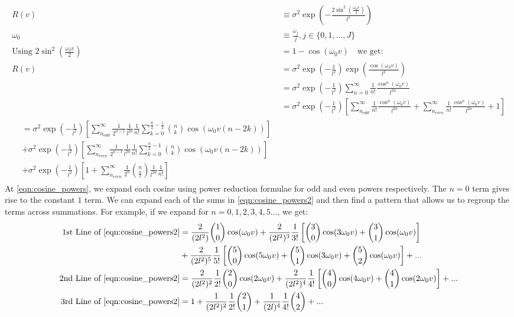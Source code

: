 \begin{align}
R(v) &\equiv \sigma^2 \exp (- \frac{2\sin^2(\frac{\omega_0 v}{2})}{l^2}) \\
\omega_0 &\equiv \frac{\omega_j}{j}, j \in \{0, 1,..., J\} \\
\text{Using } 2\sin^2(\frac{\omega_0 v}{2}) &=  1 - \cos(\omega_0 v) \quad \text{we get:}\\
R(v) &=  \sigma^2 \exp (- \frac{1}{l^2}) \exp (\frac{\cos(\omega_0 v)}{l^2}) \\
 &=  \sigma^2 \exp (- \frac{1}{l^2}) \sum_{n = 0}^{\infty} \frac{1}{n!} \frac{\cos^n(\omega_0 v)}{l^{2n}} \label{eqn:periodic_1}\\
&= \sigma^2 \exp (- \frac{1}{l^2}) \left[\sum_{n_{odd}}^{\infty} \frac{1}{n!} \frac{\cos^n(\omega_0 v)}{l^{2n}} + \sum_{n_{even}}^{\infty} \frac{1}{n!} \frac{\cos^n(\omega_0 v)}{l^{2n}} + 1 \right] \label{eqn:cosine_powers} \\ \begin{split} 
& =\sigma^2 \exp (- \frac{1}{l^2})  \left[ \sum_{n_{odd}}^{\infty} \frac{1}{2^{n-1}} \frac{1}{l^{2n}} \frac{1}{n!}  \sum_{k=0}^{\frac{n}{2} - \frac{1}{2}} \binom{n}{k} \cos(\omega_0v (n -2k))\right] \\
& +\sigma^2 \exp (- \frac{1}{l^2})  \left[ \sum_{n_{even}}^{\infty}  \frac{1}{2^{n-1}} \frac{1}{l^{2n}} \frac{1}{n!}  \sum_{k=0}^{\frac{n}{2} - 1} \binom{n}{k} \cos(\omega_0v (n -2k))\right] \\
& +\sigma^2 \exp (- \frac{1}{l^2})  \left[ 1 +  \sum_{n_{even}}^{\infty}  \frac{1}{2^{n}} \binom{n}{\frac{n}{2}} \frac{1}{l^{2n}} \frac{1}{n!} \right] \label{eqn:cosine_powers2}
\end{split} 
\end{align}
At \ref{eqn:cosine_powers}, we expand each cosine using power reduction formulae for odd and even powers respectively. The $n=0$ term gives rise to the constant $1$ term.  We can expand each of the sums in \ref{eqn:cosine_powers2} and then find a pattern that allows us to regroup the terms across summations. For example, if we expand for $n = 0,1,2,3,4,5...$, we get:
\begin{align}
\text{1st Line of \ref{eqn:cosine_powers2}} &= \frac{2}{(2l^2)}\binom{1}{0} \cos(\omega_0 v) + \frac{2}{(2l^2)^3} \frac{1}{3!} \left[\binom{3}{0} \cos(3 \omega_0 v) + \binom{3}{1} \cos(\omega_0v) \right]  \\
&+ \frac{2}{(2l^2)^5} \frac{1}{5!} \left[\binom{5}{0} \cos(5\omega_0v) + \binom{5}{1} \cos(3\omega_0 v) + \binom{5}{2} \cos(\omega_0 v)\right] + ... \\
\text{2nd Line of \ref{eqn:cosine_powers2}} &= \frac{2}{(2l^2)^2} \frac{1}{2!} \binom{2}{0}\cos(2 \omega_0 v) + \frac{2}{(2l^2)^4} \frac{1}{4!} \left[\binom{4}{0} \cos(4 \omega_0 v) + \binom{4}{1} \cos(2 \omega_0 v) \right] + ... \\
\text{3rd Line of \ref{eqn:cosine_powers2}} &=  1 + \frac{1}{(2l^2)^2} \frac{1}{2!} \binom{2}{1} + \frac{1}{(2l)^4} \frac{1}{4!} \binom{4}{2} + ...
\end{align}
